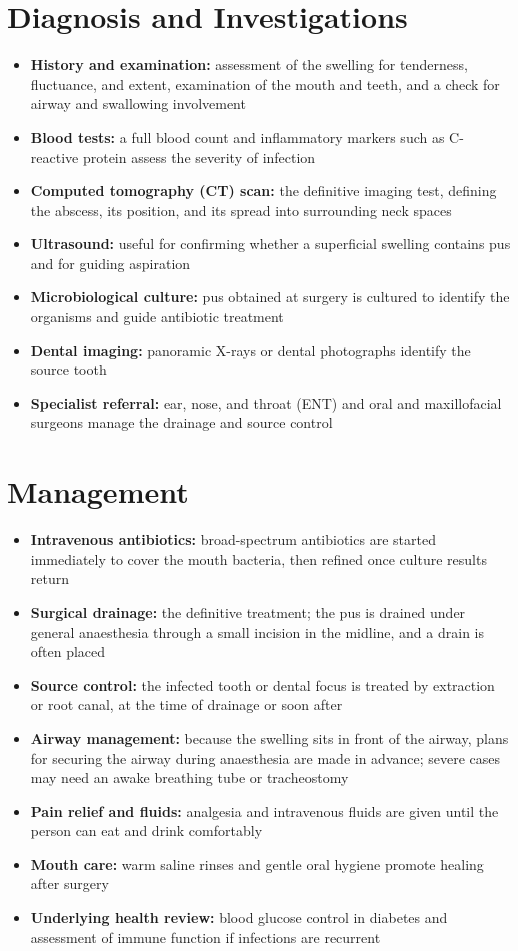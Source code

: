 \section*{Diagnosis and Investigations}
\begin{itemize}
    \item \textbf{History and examination:} assessment of the swelling for tenderness, fluctuance, and extent, examination of the mouth and teeth, and a check for airway and swallowing involvement
    \item \textbf{Blood tests:} a full blood count and inflammatory markers such as C-reactive protein assess the severity of infection
    \item \textbf{Computed tomography (CT) scan:} the definitive imaging test, defining the abscess, its position, and its spread into surrounding neck spaces
    \item \textbf{Ultrasound:} useful for confirming whether a superficial swelling contains pus and for guiding aspiration
    \item \textbf{Microbiological culture:} pus obtained at surgery is cultured to identify the organisms and guide antibiotic treatment
    \item \textbf{Dental imaging:} panoramic X-rays or dental photographs identify the source tooth
    \item \textbf{Specialist referral:} ear, nose, and throat (ENT) and oral and maxillofacial surgeons manage the drainage and source control
\end{itemize}

\section*{Management}
\begin{itemize}
    \item \textbf{Intravenous antibiotics:} broad-spectrum antibiotics are started immediately to cover the mouth bacteria, then refined once culture results return
    \item \textbf{Surgical drainage:} the definitive treatment; the pus is drained under general anaesthesia through a small incision in the midline, and a drain is often placed
    \item \textbf{Source control:} the infected tooth or dental focus is treated by extraction or root canal, at the time of drainage or soon after
    \item \textbf{Airway management:} because the swelling sits in front of the airway, plans for securing the airway during anaesthesia are made in advance; severe cases may need an awake breathing tube or tracheostomy
    \item \textbf{Pain relief and fluids:} analgesia and intravenous fluids are given until the person can eat and drink comfortably
    \item \textbf{Mouth care:} warm saline rinses and gentle oral hygiene promote healing after surgery
    \item \textbf{Underlying health review:} blood glucose control in diabetes and assessment of immune function if infections are recurrent
\end{itemize}

